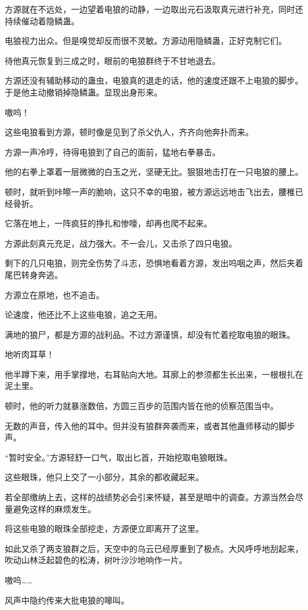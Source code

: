 \begin{this_body}
方源就在不远处，一边望着电狼的动静，一边取出元石汲取真元进行补充，同时还持续催动着隐鳞蛊。

电狼视力出众。但是嗅觉却反而很不灵敏。方源动用隐鳞蛊，正好克制它们。

待他真元恢复到三成之时，眼前的电狼群终于不甘地退去。

方源还没有辅助移动的蛊虫，电狼真的退走的话，他的速度还跟不上电狼的脚步。于是他主动撤销掉隐鳞蛊。显现出身形来。

嗷呜！

这些电狼看到方源，顿时像是见到了杀父仇人，齐齐向他奔扑而来。

方源一声冷哼，待得电狼到了自己的面前，猛地右拳暴击。

他的右拳上罩着一层微微的白玉之光，坚硬无比。狠狠地击打在一只电狼的腰上。

顿时，就听到咔嚓一声的脆响，这只不幸的电狼，被方源远远地击飞出去，腰椎已经骨折。

它落在地上，一阵疯狂的挣扎和惨嚎，却再也爬不起来。

方源此刻真元充足，战力强大。不一会儿，又击杀了四只电狼。

剩下的几只电狼，则完全伤势了斗志，恐惧地看着方源，发出呜咽之声，然后夹着尾巴转身奔逃。

方源立在原地，也不追击。

论速度，他还比不上这些电狼，追之无用。

满地的狼尸，都是方源的战利品。不过方源谨慎，却没有忙着挖取电狼的眼珠。

地听肉耳草！

他半蹲下来，用手掌撑地，右耳贴向大地。耳廓上的参须都生长出来，一根根扎在泥土里。

顿时，他的听力就暴涨数倍，方圆三百步的范围内皆在他的侦察范围当中。

无数的声音，传入他的耳中。但并没有狼群奔袭而来，或者其他蛊师移动的脚步声。

“暂时安全。”方源轻舒一口气，取出匕首，开始挖取电狼眼珠。

这些眼珠，他只上交了一小部分，其余的都收藏起来。

若全部缴纳上去，这样的战绩势必会引来怀疑，甚至是暗中的调查。方源当然会尽量避免这样的麻烦发生。

将这些电狼的眼珠全部挖走，方源便立即离开了这里。

如此又杀了两支狼群之后，天空中的乌云已经厚重到了极点。大风呼呼地刮起来，吹动山林泛起碧色的松涛，树叶沙沙地响作一片。

嗷呜……

风声中隐约传来大批电狼的嗥叫。


\end{this_body}
